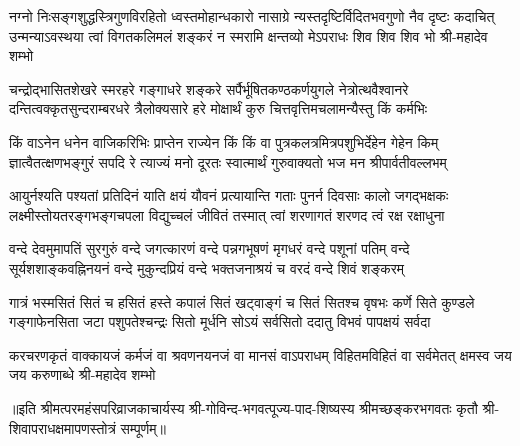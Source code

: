 \fourlineindentedshloka
{नग्नो निःसङ्गशुद्धस्त्रिगुणविरहितो ध्वस्तमोहान्धकारो}
{नासाग्रे न्यस्तदृष्टिर्विदितभवगुणो नैव दृष्टः कदाचित्}
{उन्मन्याऽवस्थया त्वां विगतकलिमलं शङ्करं न स्मरामि}
{क्षन्तव्यो मेऽपराधः शिव शिव शिव भो श्री-महादेव शम्भो} %

\fourlineindentedshloka
{चन्द्रोद्भासितशेखरे स्मरहरे गङ्गाधरे शङ्करे}
{सर्पैर्भूषितकण्ठकर्णयुगले नेत्रोत्थवैश्वानरे}
{दन्तित्वक्कृतसुन्दराम्बरधरे त्रैलोक्यसारे हरे}
{मोक्षार्थं कुरु चित्तवृत्तिमचलामन्यैस्तु किं कर्मभिः} %


\fourlineindentedshloka
{किं वाऽनेन धनेन वाजिकरिभिः प्राप्तेन राज्येन किं}
{किं वा पुत्रकलत्रमित्रपशुभिर्देहेन गेहेन किम्}
{ज्ञात्वैतत्क्षणभङ्गुरं सपदि रे त्याज्यं मनो दूरतः}
{स्वात्मार्थं गुरुवाक्यतो भज मन श्रीपार्वतीवल्लभम्} %

\fourlineindentedshloka
{आयुर्नश्यति पश्यतां प्रतिदिनं याति क्षयं यौवनं}
{प्रत्यायान्ति गताः पुनर्न दिवसाः कालो जगद्भक्षकः}
{लक्ष्मीस्तोयतरङ्गभङ्गचपला विद्युच्चलं जीवितं}
{तस्मात् त्वां शरणागतं शरणद त्वं रक्ष रक्षाधुना} %


\fourlineindentedshloka
{वन्दे देवमुमापतिं सुरगुरुं वन्दे जगत्कारणं}
{वन्दे पन्नगभूषणं मृगधरं वन्दे पशूनां पतिम्}
{वन्दे सूर्यशशाङ्कवह्निनयनं वन्दे मुकुन्दप्रियं}
{वन्दे भक्तजनाश्रयं च वरदं वन्दे शिवं शङ्करम्} %

\fourlineindentedshloka
{गात्रं भस्मसितं सितं च हसितं हस्ते कपालं सितं}
{खट्वाङ्गं च सितं सितश्च वृषभः कर्णे सिते कुण्डले}
{गङ्गाफेनसिता जटा पशुपतेश्चन्द्रः सितो मूर्धनि}
{सोऽयं सर्वसितो ददातु विभवं पापक्षयं सर्वदा} %

\fourlineindentedshloka
{करचरणकृतं वाक्कायजं कर्मजं वा}
{श्रवणनयनजं वा मानसं वाऽपराधम्}
{विहितमविहितं वा सर्वमेतत् क्षमस्व}
{जय जय करुणाब्धे श्री-महादेव शम्भो} %


॥इति श्रीमत्परमहंसपरिव्राजकाचार्यस्य श्री-गोविन्द-भगवत्पूज्य-पाद-शिष्यस्य
श्रीमच्छङ्करभगवतः कृतौ श्री-शिवापराधक्षमापणस्तोत्रं सम्पूर्णम्॥
\setlength{\shlokaspaceskip}{24pt}